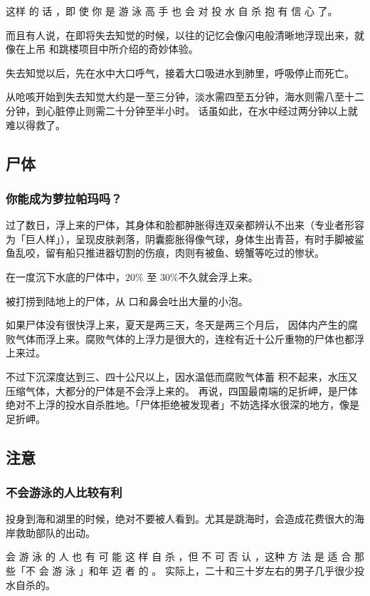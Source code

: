 \documentclass[UTF8]{ctexart}
\begin{document}
这样 的 话 ，即 使 你 是 游 泳 高 手 也 会 对 投 水 自 杀 抱 有 信 心 了。

而且有人说，在即将失去知觉的时候，以往的记忆会像闪电般清晰地浮现出来，就像在上吊 和跳楼项目中所介绍的奇妙体验。

失去知觉以后，先在水中大口呼气，接着大口吸进水到肺里，呼吸停止而死亡。

从呛咳开始到失去知觉大约是一至三分钟，淡水需四至五分钟，海水则需八至十二分钟，到心脏停止则需二十分钟至半小时。
话虽如此，在水中经过两分钟以上就难以得救了。


\subsection{尸体}

\subsubsection*{你能成为萝拉帕玛吗？}

过了数日，浮上来的尸体，其身体和脸都肿胀得连双亲都辨认不出来（专业者形容为「巨人样」），呈现皮肤剥落，阴囊膨胀得像气球，身体生出青苔，有时手脚被鲨鱼乱咬，留有船只推进器切割的伤痕，肉则有被鱼、螃蟹等吃过的惨状。

在一度沉下水底的尸体中，$20\%$ 至 $30\%$不久就会浮上来。

被打捞到陆地上的尸体，从 口和鼻会吐出大量的小泡。

如果尸体没有很快浮上来，夏天是两三天，冬天是两三个月后， 因体内产生的腐败气体而浮上来。腐败气体的上浮力是很大的，连栓有近十公斤重物的尸体也都浮上来过。

不过下沉深度达到三、四十公尺以上，因水温低而腐败气体蓄 积不起来，水压又压缩气体，大都分的尸体是不会浮上来的。 再说，四国最南端的足折岬，是尸体绝对不上浮的投水自杀胜地。「尸体拒绝被发现者」不妨选择水很深的地方，像是足折岬。



\subsection{注意}

\subsubsection*{不会游泳的人比较有利}

投身到海和湖里的时候，绝对不要被人看到。尤其是跳海时，会造成花费很大的海岸救助部队的出动。

会 游 泳 的 人 也 有 可 能 这 样 自 杀 ，但 不 可 否 认 ，这种 方 法 是 适 合 那 些「不 会 游 泳 」和年 迈 者 的 。 实际上，二十和三十岁左右的男子几乎很少投水自杀的。
\end{document}
